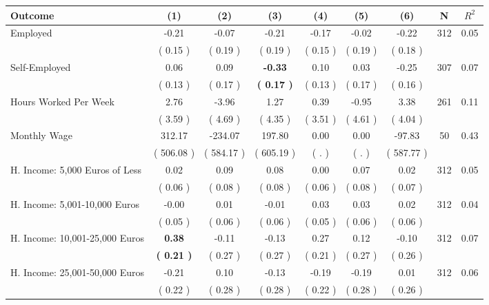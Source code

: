 \begin{tabular}{lcccccccc}
\toprule
 \textbf{Outcome} & \textbf{(1)} & \textbf{(2)} & \textbf{(3)} & \textbf{(4)} & \textbf{(5)} & \textbf{(6)} & \textbf{N} & \textbf{$ R^2$} \\
\midrule
Employed &     -0.21 &     -0.07 &     -0.21 &     -0.17 &     -0.02 &     -0.22 & 312 &       0.05 \\ 
 & (     0.15 ) & (     0.19 ) & (     0.19 ) & (     0.15 ) & (     0.19 ) & (     0.18 ) & \\
Self-Employed &      0.06 &      0.09 & \textbf{    -0.33} &      0.10 &      0.03 &     -0.25 & 307 &       0.07 \\ 
 & (     0.13 ) & (     0.17 ) & \textbf{(     0.17 )} & (     0.13 ) & (     0.17 ) & (     0.16 ) & \\
Hours Worked Per Week &      2.76 &     -3.96 &      1.27 &      0.39 &     -0.95 &      3.38 & 261 &       0.11 \\ 
 & (     3.59 ) & (     4.69 ) & (     4.35 ) & (     3.51 ) & (     4.61 ) & (     4.04 ) & \\
Monthly Wage &    312.17 &   -234.07 &    197.80 &      0.00 &      0.00 &    -97.83 & 50 &       0.43 \\ 
 & (   506.08 ) & (   584.17 ) & (   605.19 ) & (        . ) & (        . ) & (   587.77 ) & \\
H. Income: 5,000 Euros of Less &      0.02 &      0.09 &      0.08 &      0.00 &      0.07 &      0.02 & 312 &       0.05 \\ 
 & (     0.06 ) & (     0.08 ) & (     0.08 ) & (     0.06 ) & (     0.08 ) & (     0.07 ) & \\
H. Income: 5,001-10,000 Euros &     -0.00 &      0.01 &     -0.01 &      0.03 &      0.03 &      0.02 & 312 &       0.04 \\ 
 & (     0.05 ) & (     0.06 ) & (     0.06 ) & (     0.05 ) & (     0.06 ) & (     0.06 ) & \\
H. Income: 10,001-25,000 Euros & \textbf{     0.38} &     -0.11 &     -0.13 &      0.27 &      0.12 &     -0.10 & 312 &       0.07 \\ 
 & \textbf{(     0.21 )} & (     0.27 ) & (     0.27 ) & (     0.21 ) & (     0.27 ) & (     0.26 ) & \\
H. Income: 25,001-50,000 Euros &     -0.21 &      0.10 &     -0.13 &     -0.19 &     -0.19 &      0.01 & 312 &       0.06 \\ 
 & (     0.22 ) & (     0.28 ) & (     0.28 ) & (     0.22 ) & (     0.28 ) & (     0.26 ) & \\

\end{tabular}
